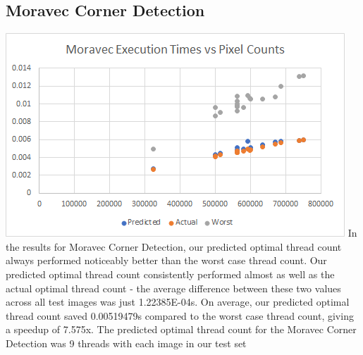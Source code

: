 \documentclass{article}
\begin{document}
    \subsection{Moravec Corner Detection}
    \includegraphics[width=\textwidth]{source/images/corner_detection.png}
    In the results for Moravec Corner Detection, our predicted optimal thread count always performed noticeably better than the worst case thread count. Our predicted optimal thread count consistently performed almost as well as the actual optimal thread count - the average difference between these two values across all test images was just 1.22385E-04s. On average, our predicted optimal thread count saved 0.00519479s compared to the worst case thread count, giving a speedup of 7.575x. The predicted optimal thread count for the Moravec Corner Detection was 9 threads with each image in our test set
    
\end{document}
